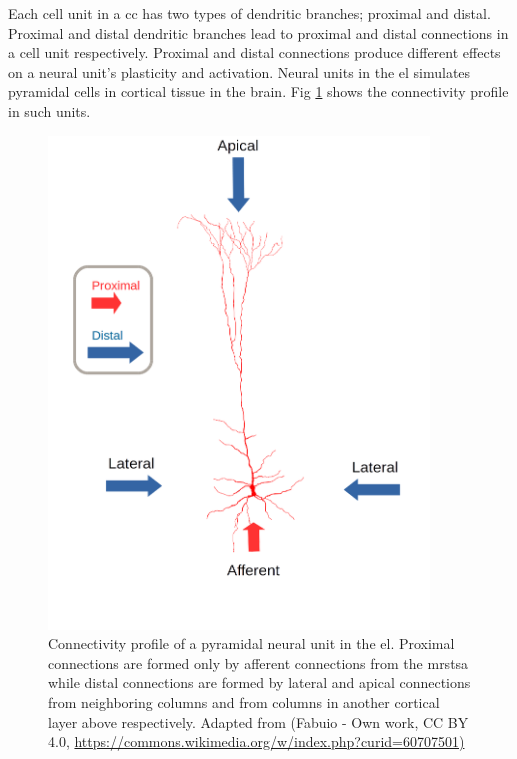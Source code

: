 \documentclass[10pt,letterpaper]{article}
\begin{document}
Each cell unit in a \gls{cc} has two types of dendritic branches; proximal and distal.
Proximal and distal dendritic branches lead to proximal and distal connections in a cell unit respectively.
Proximal and distal connections produce different effects on a neural unit's plasticity and activation.
Neural units in the \gls{el} simulates pyramidal cells in cortical tissue in the brain.
Fig \ref{fig:PyramidalCell} shows the connectivity profile in such units. 

\begin{figure}[h!]
    \centering
    \includegraphics[width=0.9\textwidth]{PyramidalCell.png}
    \caption{Connectivity profile of a pyramidal neural unit in the \gls{el}.
    Proximal connections are formed only by afferent connections from the \gls{mrstsa}
    while distal connections are formed by lateral and apical connections from neighboring columns and
    from columns in another cortical layer above respectively.
    Adapted from 
    (Fabuio - Own work, CC BY 4.0, \url{https://commons.wikimedia.org/w/index.php?curid=60707501)}}
    \label{fig:PyramidalCell}
\end{figure}
\end{document}
